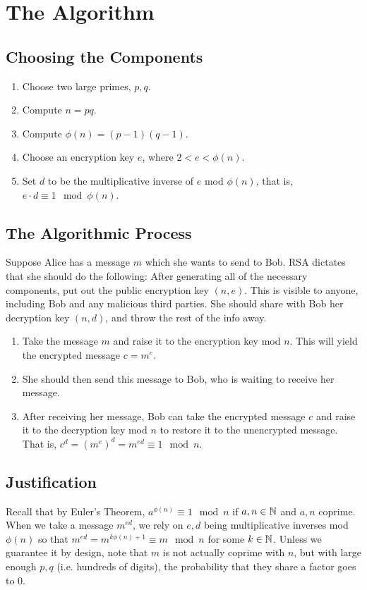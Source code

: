 \documentclass{exam}
\begin{document}
\newpage
\section*{The Algorithm}
\subsection*{Choosing the Components}
\begin{enumerate}
    \item Choose two large primes, $p,q$.
    \item Compute $n = pq$.
    \item Compute $\phi(n) = (p - 1)(q - 1)$.
    \item Choose an encryption key $e$, where $2 < e < \phi(n)$.
    \item Set $d$ to be the multiplicative inverse of $e$ mod $\phi(n)$, that is, $e\cdot d \equiv 1 \mod \phi(n)$.
\end{enumerate}

\subsection*{The Algorithmic Process}
Suppose Alice has a message $m$ which she wants to send to Bob. RSA dictates that she should do the following:
After generating all of the necessary components, put out the public encryption key $(n, e)$. This is visible to anyone,
including Bob and any malicious third parties. She should share with Bob her decryption key $(n, d)$, and throw the rest of
the info away.
\begin{enumerate}
    \item Take the message $m$ and raise it to the encryption key mod $n$. This will yield the 
    encrypted message $c = m^e$.
    \item She should then send this message to Bob, who is waiting to receive her message.
    \item After receiving her message, Bob can take the encrypted message $c$ and raise it to the 
    decryption key mod $n$ to restore it to the unencrypted message. That is, $c^d = (m^e)^d = m^{ed} \equiv 1 \mod n$.
\end{enumerate}

\subsection*{Justification}
Recall that by Euler's Theorem, $a^{\phi(n)} \equiv 1 \mod n$ if $a,n\in\mathbb {N}$ and $a, n$ coprime. When we 
take a message $m^{ed}$, we rely on $e,d$ being multiplicative inverses mod $\phi(n)$ so that 
$m^{ed} = m^{k\phi(n) + 1} \equiv m \mod n$ for some $k\in\mathbb {N}$. Unless we guarantee it by design, note that 
$m$ is not actually coprime with $n$, but with large enough $p, q$ (i.e. hundreds of digits), the probability
that they share a factor goes to 0.
\end{document}
